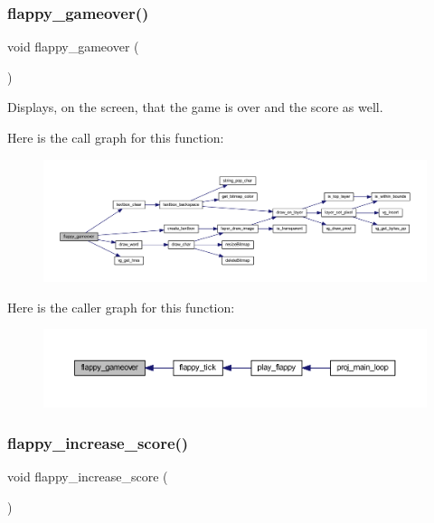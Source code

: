 \subsubsection{\texorpdfstring{flappy\+\_\+gameover()}{flappy\_gameover()}}
{\footnotesize\ttfamily void flappy\+\_\+gameover (\begin{DoxyParamCaption}{ }\end{DoxyParamCaption})}



Displays, on the screen, that the game is over and the score as well. 

Here is the call graph for this function\+:\nopagebreak
\begin{figure}[H]
\begin{center}
\leavevmode
\includegraphics[width=350pt]{group__flappy_gab4a401acb5fffbf99413000dcdff3486_cgraph}
\end{center}
\end{figure}
Here is the caller graph for this function\+:\nopagebreak
\begin{figure}[H]
\begin{center}
\leavevmode
\includegraphics[width=350pt]{group__flappy_gab4a401acb5fffbf99413000dcdff3486_icgraph}
\end{center}
\end{figure}
\mbox{\label{group__flappy_gadf33bb76c8456ea822eb71ecc5325ee3}} 
\subsubsection{\texorpdfstring{flappy\+\_\+increase\+\_\+score()}{flappy\_increase\_score()}}
{\footnotesize\ttfamily void flappy\+\_\+increase\+\_\+score (\begin{DoxyParamCaption}{ }\end{DoxyParamCaption})}



